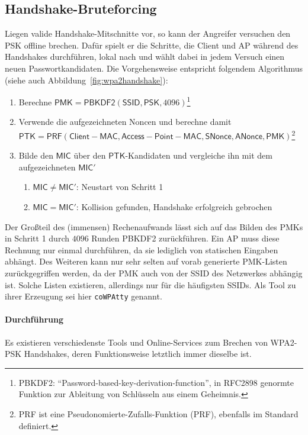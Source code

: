 \subsection{Handshake-Bruteforcing}\label{subs:cracking}
Liegen valide Handshake-Mitschnitte vor, so kann der Angreifer versuchen den PSK offline brechen.
Dafür spielt er die Schritte, die Client und AP während des Handshakes durchführen, lokal nach und wählt dabei in jedem Versuch einen neuen Passwortkandidaten.
Die Vorgehensweise entspricht folgendem Algorithmus (siehe auch Abbildung~\ref{fig:wpa2handshake}):
\begin{enumerate}
	\item Berechne $\mathsf{PMK} = \mathsf{PBKDF2}(\mathsf{SSID}, \mathsf{PSK}, 4096)$\footnote{PBKDF2: \enquote{Password-based-key-derivation-function}, in RFC2898 genormte Funktion zur Ableitung von Schlüsseln aus einem Geheimnis.}
	\item Verwende die aufgezeichneten Noncen und berechne damit \\$\mathsf{PTK} = \mathsf{PRF}(\mathsf{Client-MAC},  \mathsf{Access-Point-MAC}, \mathsf{SNonce}, \mathsf{ANonce}, \mathsf{PMK})$\footnote{PRF ist eine Pseudonomierte-Zufalls-Funktion (PRF), ebenfalls im Standard definiert.}
	\item Bilde den $\mathsf{MIC}$ über den $\mathsf{PTK}$-Kandidaten und vergleiche ihn mit dem aufgezeichneten $\mathsf{MIC'}$
	\begin{enumerate}
		\item $\mathsf{MIC} \neq \mathsf{MIC'}$: Neustart von Schritt 1
		\item $\mathsf{MIC} = \mathsf{MIC'}$: Kollision gefunden, Handshake erfolgreich gebrochen
	\end{enumerate}
\end{enumerate}
Der Großteil des (immensen) Rechenaufwands lässt sich auf das Bilden des PMKs in Schritt 1 durch $4096$ Runden PBKDF2 zurückführen. Ein AP muss diese Rechnung nur einmal durchführen, da sie lediglich von statischen Eingaben abhängt.
Des Weiteren kann nur sehr selten auf vorab generierte PMK-Listen zurückgegriffen werden, da der PMK auch von der SSID des Netzwerkes abhängig ist. Solche Listen existieren, allerdings nur für die häufigsten SSIDs. Als Tool zu ihrer Erzeugung sei hier \texttt{coWPAtty} genannt.

\paragraph{Durchführung}
Es existieren verschiedenste Tools und Online-Services zum Brechen von WPA2-PSK Handshakes, deren Funktionsweise letztlich immer dieselbe ist.

